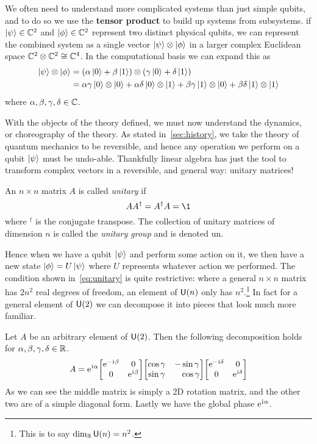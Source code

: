 We often need to understand more complicated systems than just simple qubits, and to do so we use the \textbf{tensor product} to build up systems from subsystems.
\Eg{} if $\ket{\psi}\in\mathbb{C}^2$ and $\ket{\phi}\in\mathbb{C}^2$ represent two distinct physical qubits, we can represent the combined system as a single vector $\ket{\psi}\otimes \ket{\phi}$ in a larger complex Euclidean space $\mathbb{C}^2\otimes \mathbb{C}^2\cong \mathbb{C}^4$.
In the computational basis we can expand this as
\begin{align}
    \ket{\psi}\otimes \ket{\phi} & = \qty(\alpha\ket{0} + \beta\ket{1})\otimes\qty(\gamma\ket{0} + \delta\ket{1})                                                                \\
                                 & = \alpha\gamma\ket{0}\otimes\ket{0} + \alpha\delta\ket{0}\otimes\ket{1} + \beta\gamma\ket{1}\otimes\ket{0} + \beta\delta\ket{1}\otimes\ket{1}
\end{align}
where $\alpha, \beta, \gamma, \delta \in \mathbb{C}$.

With the objects of the theory defined, we must now understand the dynamics, or choreography of the theory.
As stated in~\cref{sec:history}, we take the theory of quantum mechanics to be reversible, and hence any operation we perform on a qubit $\ket{\psi}$ must be undo-able.
Thankfully linear algebra has just the tool to transform complex vectors in a reversible, and general way: unitary matrices!
\begin{definition}
    An $n\times n$ matrix $A$ is called \emph{unitary} if
    \begin{equation}\label{eq:unitary}
        AA^\dagger = A^\dagger A = \1
    \end{equation}
    where $^\dagger$ is the conjugate transpose.
    The collection of unitary matrices of dimension $n$ is called the \emph{unitary group} and is denoted \gls{un}.
\end{definition}
Hence when we have a qubit $\ket{\psi}$ and perform some action on it, we then have a new state $\ket{\phi} = U\ket{\psi}$ where $U$ represents whatever action we performed.
The condition shown in~\cref{eq:unitary} is quite restrictive: where a general $n \times n$ matrix has $2n^2$ real degrees of freedom, an element of $\mathsf{U} (n)$ only has $n^2$.\footnote{This is to say $\dim_{\mathbb{R}}\mathsf{U} (n) = n^2$.}
In fact for a general element of $\mathsf{U} (2)$ we can decompose it into pieces that look much more familiar.
\begin{example}
    Let $A$ be an arbitrary element of $\mathsf{U} (2)$.
    Then the following decomposition holds for $\alpha, \beta, \gamma, \delta \in \mathbb{R}$.
    \begin{equation}
        A = \e^{\iu\alpha}\mqty[\dmat[0]{\e^{-\iu \beta}, \e^{\iu \beta}}]\mqty[\cos\gamma & -\sin\gamma \\ \sin\gamma & \phantom{+}\cos\gamma]\mqty[\dmat[0]{\e^{-\iu \delta}, \e^{\iu \delta}}]
    \end{equation}
    As we can see the middle matrix is simply a 2D rotation matrix, and the other two are of a simple diagonal form.
    Lastly we have the global phase $\mathrm{e}^{\mkern1mu\mathrm{i}\mkern1mu \alpha}$.
\end{example}


